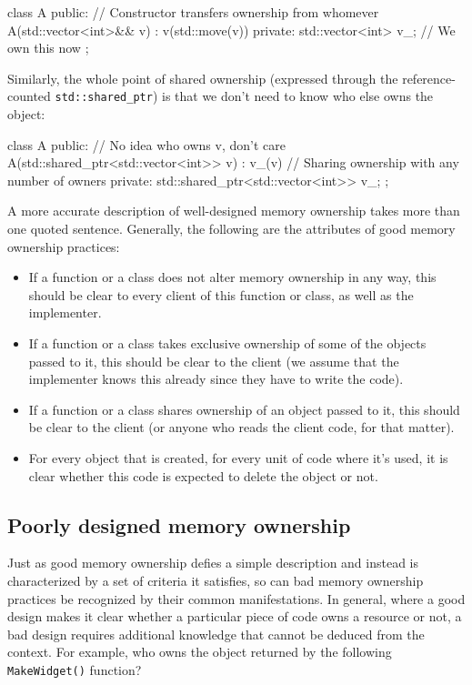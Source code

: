\begin{code}
class A {
  public:
  // Constructor transfers ownership from whomever
  A(std::vector<int>&& v) : v(std::move(v)) {}
  private:
  std::vector<int> v_;    // We own this now
};
\end{code}

Similarly, the whole point of shared ownership (expressed through the reference-counted \texttt{std::shared\_ptr}) is that we don't need to know who else owns the object:

\begin{code}
class A {
  public:
  // No idea who owns v, don't care
  A(std::shared_ptr<std::vector<int>> v) : v_(v) {}
  // Sharing ownership with any number of owners
  private:
  std::shared_ptr<std::vector<int>> v_;
};
\end{code}

A more accurate description of well-designed memory ownership takes more than one quoted sentence. Generally, the following are the attributes of good memory ownership practices:

\begin{itemize}
\item
  If a function or a class does not alter memory ownership in any way, this should be clear to every client of this function or class, as well as the implementer.
\item
  If a function or a class takes exclusive ownership of some of the objects passed to it, this should be clear to the client (we assume that the implementer knows this already since they have to write the code).
\item
  If a function or a class shares ownership of an object passed to it, this should be clear to the client (or anyone who reads the client code, for that matter).
\item
  For every object that is created, for every unit of code where it's used, it is clear whether this code is expected to delete the object or not.
\end{itemize}

\subsection{Poorly designed memory ownership}

Just as good memory ownership defies a simple description and instead is characterized by a set of criteria it satisfies, so can bad memory ownership practices be recognized by their common manifestations. In general, where a good design makes it clear whether a particular piece of code owns a resource or not, a bad design requires additional knowledge that cannot be deduced from the context. For example, who owns the object returned by the following \texttt{MakeWidget()} function?

